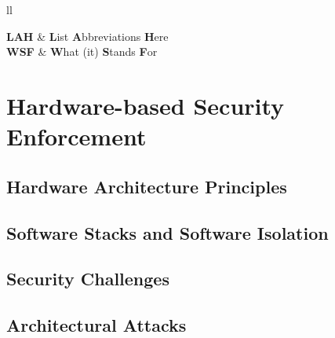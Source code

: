 \documentclass[
11pt, %
english, %
singlespacing, %
headsepline, %
]{MastersDoctoralThesis} %
\begin{document}
\begin{abbreviations}{ll} %

  \textbf{LAH} & \textbf{L}ist \textbf{A}bbreviations \textbf{H}ere\\
  \textbf{WSF} & \textbf{W}hat (it) \textbf{S}tands \textbf{F}or\\

\end{abbreviations}




\mainmatter %

\pagestyle{thesis} %




\chapter{Hardware-based Security Enforcement}

\section{Hardware Architecture Principles}

\section{Software Stacks and Software Isolation}

\section{Security Challenges}

\section{Architectural Attacks}
\end{document}
